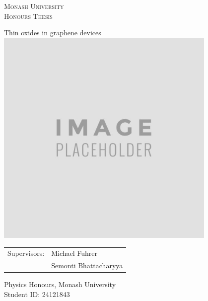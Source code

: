 \documentclass{report}
\title{}
\date{\today}
\author{Matthew Gebert}
\begin{document}
	
	\begin{titlepage}
		\centering
		\scshape\LARGE Monash University\\
		\vspace{5mm}\Large Honours Thesis\\\vspace{1.5cm}
		
		\myTitle Thin oxides in graphene devices\\
		\normalfont\normalsize
		\vspace{5mm}\includegraphics[width=0.8\textwidth]{placeholder.png}
		\vspace{5mm}
		\begin{flushleft}
			\hrulefill
		\end{flushleft}
		\begin{tabularx}{\textwidth}{Xl}
			Supervisors:&Michael Fuhrer\\
			&Semonti Bhattacharyya
		\end{tabularx}\newline
		\begin{flushleft}
			\hrulefill
		\end{flushleft}
		\begin{center}
			Physics Honours, Monash University\\Student ID: 24121843
		\end{center}
		\vspace{3mm}
		
		\newpage 
		\vspace{1cm}\hspace{1cm}
	
	\end{titlepage}
	\newpage
	
\end{document}
